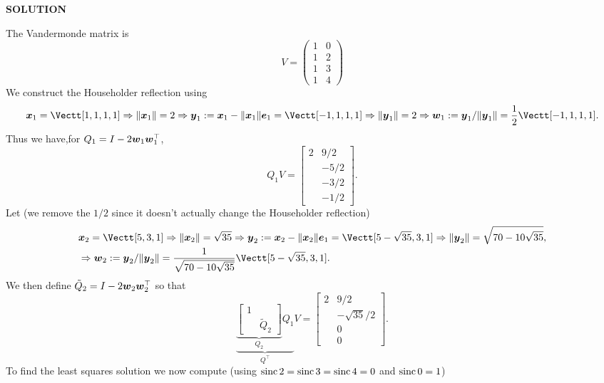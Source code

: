\documentclass[12pt,a4paper]{article}
\def\x{ {\vc x} }
\def\e{ {\vc e} }
\def\y{ {\vc y} }
\def\w{ {\vc w} }
\def\sinc{ {\rm sinc}\, }
\begin{document}
\textbf{SOLUTION}

The Vandermonde matrix is
\[
V = \begin{pmatrix}
1 & 0 \\ 
1 & 2 \\
1 & 3 \\
1 & 4
\end{pmatrix}
\]
We construct the Householder reflection using
\[
\ensuremath{\bm{\x}}_1 = \Vectt[1,1,1,1] \ensuremath{\Rightarrow} \| \ensuremath{\bm{\x}}_1 \| = 2 \ensuremath{\Rightarrow} \ensuremath{\bm{\y}}_1 := \ensuremath{\bm{\x}}_1 - \| \ensuremath{\bm{\x}}_1 \| \ensuremath{\bm{\e}}_1 = \Vectt[-1,1,1,1] \ensuremath{\Rightarrow} \|\ensuremath{\bm{\y}}_1\| = 2 \ensuremath{\Rightarrow} \ensuremath{\bm{\w}}_1 := \ensuremath{\bm{\y}}_1/\|\ensuremath{\bm{\y}}_1\| = {1 \over 2}\Vectt[-1,1,1,1].
\]
Thus we have,for $Q_1 = I - 2 \ensuremath{\bm{\w}}_1 \ensuremath{\bm{\w}}_1^\ensuremath{\top}$,
\[
Q_1 V = \begin{bmatrix} 2 & 9/2 \\ & -5/2 \\ & -3/2 \\ & -1/2 \end{bmatrix}.
\]
Let (we remove the $1/2$ since it doesn't actually change the Householder reflection)
\begin{align*}
&\ensuremath{\bm{\x}}_2 = \Vectt[5,3,1] \ensuremath{\Rightarrow} \| \ensuremath{\bm{\x}}_2 \| = \sqrt{35} \ensuremath{\Rightarrow} \ensuremath{\bm{\y}}_2 :=  \ensuremath{\bm{\x}}_2 - \| \ensuremath{\bm{\x}}_2 \| \ensuremath{\bm{\e}}_1 = \Vectt[5-\sqrt{35},3,1] \ensuremath{\Rightarrow} \|\ensuremath{\bm{\y}}_2\| = \sqrt{70 - 10\sqrt{35}} , \\
 & \ensuremath{\Rightarrow}  \ensuremath{\bm{\w}}_2 := \ensuremath{\bm{\y}}_2/\|\ensuremath{\bm{\y}}_2\| = {1 \over  \sqrt{70 - 10\sqrt{35}}} \Vectt[5-\sqrt{35},3,1].
\end{align*}
We then define $\tilde{Q}_2 = I-2 \ensuremath{\bm{\w}}_2 \ensuremath{\bm{\w}}_2^\ensuremath{\top}$ so that
\[
\underbrace{\underbrace{\begin{bmatrix}1 \\ & \tilde{Q}_2 \end{bmatrix}}_{Q_2} Q_1}_{Q^\ensuremath{\top}}   V = \begin{bmatrix} 2 & 9/2 \\
& -\sqrt{35}/2 \\ & 0 \\ & 0 \end{bmatrix}.
\]
To find the least squares solution we now compute (using $\sinc 2 = \sinc 3 = \sinc 4 = 0$ and $\sinc 0 = 1$)
\end{document}
